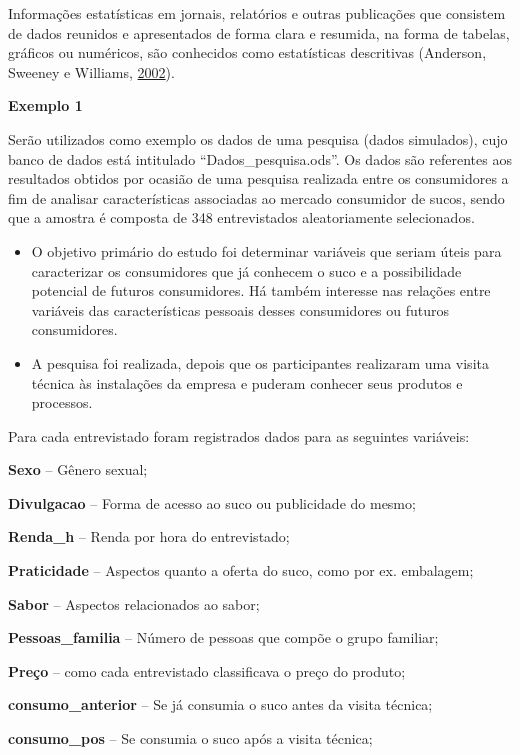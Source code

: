 \documentclass[12pt,brazil,oneside]{book}
\begin{document}
Informações estatísticas em jornais, relatórios e outras publicações que consistem de dados reunidos e apresentados de forma clara e resumida, na forma de tabelas, gráficos ou numéricos, são conhecidos como estatísticas descritivas (Anderson, Sweeney e Williams, \protect\hyperlink{ref-anderson2002}{2002}).

\textbf{Exemplo 1}

Serão utilizados como exemplo os dados de uma pesquisa (dados simulados), cujo banco de dados está intitulado ``Dados\_pesquisa.ods''. Os dados são referentes aos resultados obtidos por ocasião de uma pesquisa realizada entre os consumidores a fim de analisar características associadas ao mercado consumidor de sucos, sendo que a amostra é composta de 348 entrevistados aleatoriamente selecionados.

\begin{itemize}
\item
  O objetivo primário do estudo foi determinar variáveis que seriam úteis para caracterizar os consumidores que já conhecem o suco e a possibilidade potencial de futuros consumidores. Há também interesse nas relações entre variáveis das características pessoais desses consumidores ou futuros consumidores.
\item
  A pesquisa foi realizada, depois que os participantes realizaram uma visita técnica às instalações da empresa e puderam conhecer seus produtos e processos.
\end{itemize}

Para cada entrevistado foram registrados dados para as seguintes variáveis:

\textbf{Sexo} -- Gênero sexual;

\textbf{Divulgacao} -- Forma de acesso ao suco ou publicidade do mesmo;

\textbf{Renda\_h} -- Renda por hora do entrevistado;

\textbf{Praticidade} -- Aspectos quanto a oferta do suco, como por ex. embalagem;

\textbf{Sabor} -- Aspectos relacionados ao sabor;

\textbf{Pessoas\_familia} -- Número de pessoas que compõe o grupo familiar;

\textbf{Preço} -- como cada entrevistado classificava o preço do produto;

\textbf{consumo\_anterior} -- Se já consumia o suco antes da visita técnica;

\textbf{consumo\_pos} -- Se consumia o suco após a visita técnica;
\end{document}
